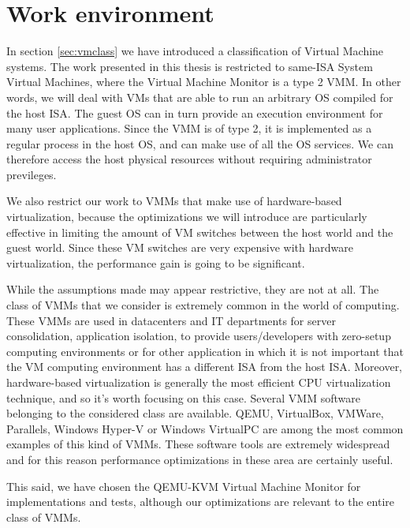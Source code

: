 \chapter{Work environment}
\label{chap:env}

In section \ref{sec:vmclass} we have introduced a classification of Virtual Machine systems.
The work presented in this thesis is restricted to same-ISA System Virtual Machines, where the Virtual Machine Monitor is a type 2 VMM.
In other words, we will deal with VMs that are able to run an arbitrary OS compiled for the host ISA. The guest OS can in turn provide an 
execution environment for many user applications.
Since the VMM is of type 2, it is implemented as a regular process in the host OS, and can make use of all the OS services.
We can therefore access the host physical resources without requiring administrator previleges.

We also restrict our work to VMMs that make use of hardware-based virtualization, because the optimizations we will introduce are
particularly effective in limiting the amount of VM switches between the host world and the guest world. Since these VM switches
are very expensive with hardware virtualization, the performance gain is going to be significant.

\vspace{0.5cm}

While the assumptions made may appear restrictive, they are not at all. The class of VMMs that we consider is extremely 
common in the world of computing. These VMMs are used in datacenters and IT departments for server consolidation, 
application isolation, to provide users/developers with zero-setup computing environments or for other application in which it is not
important that the VM computing environment has a different ISA from the host ISA. Moreover, hardware-based virtualization is generally
the most efficient CPU virtualization technique, and so it's worth focusing on this case.
Several VMM software belonging to the considered class are available. QEMU, VirtualBox, VMWare, Parallels, Windows
Hyper-V or Windows VirtualPC are among the most common examples of this kind of VMMs. These software tools are extremely widespread
and for this reason performance optimizations in these area are certainly useful.

\vspace{0.5cm}

This said, we have chosen the QEMU-KVM Virtual Machine Monitor for implementations and tests, although our optimizations are
relevant to the entire class of VMMs.

